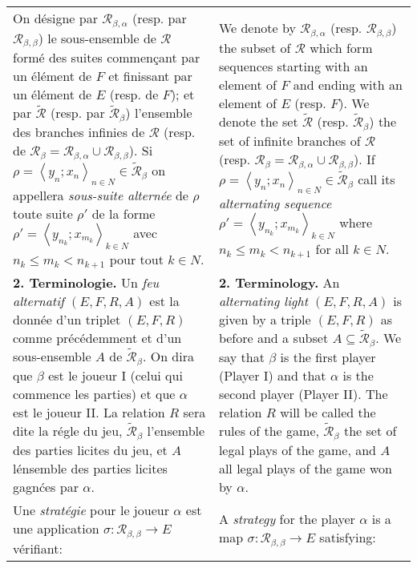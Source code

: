 \documentclass[12pt]{article}
\theoremstyle{plain}
\theoremstyle{definition}
\theoremstyle{remark}
\begin{document}
\

\begin{tabular}{p{2.8in} p{2.8in}}
On d\'esigne par $\mathcal{R}_{\beta,\alpha}$ (resp. par $\mathcal{R}_{\beta,\beta}$) le sous-ensemble de $\mathcal{R}$ form\'e des suites commen\c{c}ant par un \'el\'ement de $F$ et finissant par un \'el\'ement de $E$ (resp. de $F$); et par $\widetilde{\mathcal{R}}$ (resp. par $\widetilde{\mathcal{R}}_\beta$) l'ensemble des branches infinies de $\mathcal{R}$ (resp. de $\mathcal{R}_\beta = \mathcal{R}_{\beta,\alpha}\cup\mathcal{R}_{\beta,\beta}$). Si $\rho = \left<y_n;x_n\right>_{n\in N} \in \widetilde{\mathcal{R}}_\beta$ on appellera \textit{sous-suite altern\'ee} de $\rho$ toute suite $\rho'$ de la forme $\rho'=\left<y_{n_k};x_{m_k}\right>_{k\in N}$ avec $n_k\leq m_k < n_{k+1}$ pour tout $k\in N$.

&

We denote by $\mathcal{R}_{\beta,\alpha}$ (resp. $\mathcal{R}_{\beta,\beta}$) the subset of $\mathcal{R}$ which form sequences starting with an element of $F$ and ending with an element of $E$ (resp. $F$). We denote the set $\widetilde{\mathcal{R}}$ (resp. $\widetilde{\mathcal{R}}_\beta$) the set of infinite branches of $\mathcal{R}$ (resp. $\mathcal{R}_\beta = \mathcal{R}_{\beta,\alpha}\cup\mathcal{R}_{\beta,\beta}$). If $\rho = \left<y_n;x_n\right>_{n\in N} \in \widetilde{\mathcal{R}}_\beta$ call its \textit{alternating sequence} $\rho' = \left<y_{n_k};x_{m_k}\right>_{k\in N}$ where $n_k\leq m_k < n_{k+1}$ for all $k\in N$.

\\

\textbf{2. Terminologie.} Un \textit{feu alternatif} $(E,F,R,A)$ est la donn\'ee d'un triplet $(E,F,R)$ comme pr\'ec\'edemment et d'un sous-ensemble $A$ de $\widetilde{\mathcal{R}}_\beta$. On dira que $\beta$ est le joueur I (celui qui commence les parties) et que $\alpha$ est le joueur II. La relation $R$ sera dite la r\'egle du jeu, $\widetilde{\mathcal{R}}_\beta$ l'ensemble des parties licites du jeu, et $A$ l\'ensemble des parties licites gagn\'ces par $\alpha$.

&

\textbf{2. Terminology.} An \textit{alternating light} $(E,F,R,A)$ is given by a triple $(E,F,R)$ as before and a subset $A \subseteq \widetilde{\mathcal{R}}_\beta$. We say that $\beta$ is the first player (Player I) and that $\alpha$ is the second player (Player II). The relation $R$ will be called the rules of the game, $\widetilde{\mathcal{R}}_\beta$ the set of legal plays of the game, and $A$ all legal plays of the game won by $\alpha$.

\\

Une \textit{strat\'egie} pour le joueur $\alpha$ est une application $\sigma: \mathcal{R}_{\beta,\beta} \to E$ v\'erifiant:

&

A \textit{strategy} for the player $\alpha$ is a map $\sigma: \mathcal{R}_{\beta,\beta} \to E$ satisfying:
\end{tabular}
\end{document}
